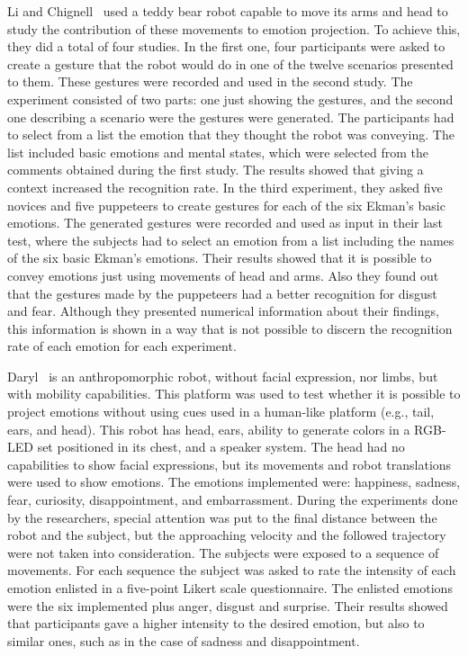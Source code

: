 Li and Chignell~\cite{Li2011} used a teddy bear robot capable to move its arms and head to study the contribution of these movements to emotion projection. To achieve this, they did a total of four studies. In the first one, four participants were asked to create a gesture that the robot would do in one of the twelve scenarios presented to them. These gestures were recorded and used in the second study. The experiment consisted of two parts: one just showing the gestures, and the second one describing a scenario were the gestures were generated. The participants had to select from a list the emotion that they thought the robot was conveying. The list included basic emotions and mental states, which were selected from the comments obtained during the first study. The results showed that giving a context increased the recognition rate. In the third experiment, they asked five novices and five puppeteers to create gestures for each of the six Ekman's basic emotions. The generated gestures were recorded and used as input in their last test, where the subjects had to select an emotion from a list including the names of the six basic Ekman's emotions. Their results showed that it is possible to convey emotions just using movements of head and arms. Also they found out that the gestures made by the puppeteers had a better recognition for disgust and fear. Although they presented numerical information about their findings, this information is shown in a way that is not possible to discern the recognition rate of each emotion for each experiment. 

Daryl~\cite{Arras2012} is an anthropomorphic robot, without facial expression, nor limbs, but with mobility capabilities. This platform was used to test whether it is possible to project emotions without using cues used in a human-like platform (e.g., tail, ears, and head). This robot has head, ears, ability to generate colors in a RGB-LED set positioned in its chest, and a speaker system. The head had no capabilities to show facial expressions, but its movements and robot translations were used to show emotions. The emotions implemented were: happiness, sadness, fear, curiosity, disappointment, and embarrassment. During the experiments done by the researchers, special attention was put to the final distance between the robot and the subject, but the approaching velocity and the followed trajectory were not taken into consideration. The subjects were exposed to a sequence of movements. For each sequence the subject was asked to rate the intensity of each emotion enlisted in a five-point Likert scale questionnaire. The enlisted emotions were the six implemented plus anger, disgust and surprise. Their results showed that participants gave a higher intensity to the desired emotion, but also to similar ones, such as in the case of sadness and disappointment. 

